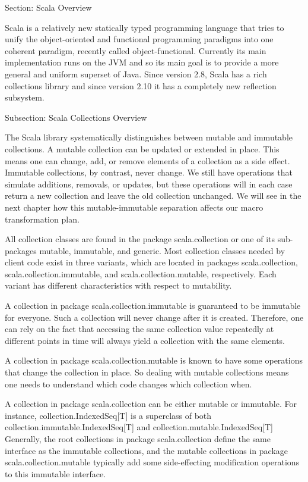 Section: Scala Overview

Scala  is a relatively new statically typed programming language
that tries to unify the object-oriented and functional programming paradigms
into one coherent paradigm, recently called object-functional. Currently its
main implementation runs on the JVM and so its main goal is to provide a more
general and uniform superset of Java. Since version 2.8, Scala has a rich
collections library and since version 2.10 it has a completely new reflection
subsystem.

Subsection: Scala Collections Overview

The Scala library systematically distinguishes between mutable and immutable
collections. A mutable collection can be updated or extended in place. This
means one can change, add, or remove elements of a collection as a side effect.
Immutable collections, by contrast, never change. We still have operations
that simulate additions, removals, or updates, but these operations will in each
case return a new collection and leave the old collection unchanged. We will see
in the next chapter how this mutable-immutable separation affects our macro
transformation plan.

All collection classes are found in the package scala.collection or one of its
sub-packages mutable, immutable, and generic. Most collection classes needed by
client code exist in three variants, which are located in packages
scala.collection, scala.collection.immutable, and scala.collection.mutable,
respectively. Each variant has different characteristics with respect to
mutability.

A collection in package scala.collection.immutable is guaranteed to be immutable
for everyone. Such a collection will never change after it is created.
Therefore, one can rely on the fact that accessing the same collection value
repeatedly at different points in time will always yield a collection with the
same elements.

A collection in package scala.collection.mutable is known to have some
operations that change the collection in place. So dealing with mutable
collections means one needs to understand which code changes which collection
when.

A collection in package scala.collection can be either mutable or immutable. For
instance, collection.IndexedSeq[T] is a superclass of both
collection.immutable.IndexedSeq[T] and collection.mutable.IndexedSeq[T]
Generally, the root collections in package scala.collection define the same
interface as the immutable collections, and the mutable collections in package
scala.collection.mutable typically add some side-effecting modification
operations to this immutable interface.

